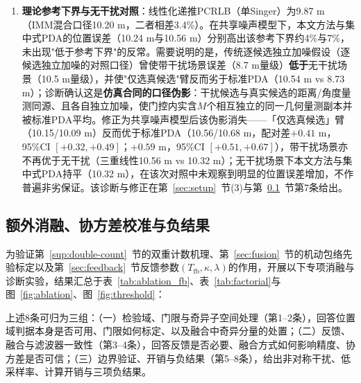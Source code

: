 \documentclass[UTF8,a4paper,zihao=-4]{ctexart}
\begin{document}
\begin{enumerate}
\item \textbf{理论参考下界与无干扰对照}：线性化递推PCRLB（单Singer）为9.87 m（IMM混合口径10.20 m，二者相差3.4\%）。在共享噪声模型下，本文方法与集中式PDA的位置误差（10.24 m与10.56 m）分别高出该参考下界约4\%与7\%，未出现"低于参考下界"的反常。需要说明的是，传统逐候选独立加噪假设（逐候选独立加噪的对照口径）曾使带干扰场景误差（8.7 m量级）\textbf{低于}无干扰场景（10.5 m量级），并使"仅选真候选"臂反而劣于标准PDA（10.54 m vs 8.73 m）；诊断确认这是\textbf{仿真合同的口径伪影}：干扰候选与真实候选的距离/角度量测同源、且各自独立加噪，使门控内实含$M$个相互独立的同一几何量测副本并被标准PDA平均。修正为共享噪声模型后该伪影消失——「仅选真候选」臂（10.15/10.09 m）反而优于标准PDA（10.56/10.68 m，配对差$+0.41$ m，95\%CI $[+0.32,+0.49]$；$+0.59$ m，95\%CI $[+0.51,+0.67]$），带干扰场景亦不再优于无干扰（三重线性10.56 m vs 10.32 m）；无干扰场景下本文方法与集中式PDA持平（10.32 m），在该次对照中未观察到明显的位置误差增加，不作普遍非劣保证。该诊断与修正在第~\ref{sec:setup}~节(3)与第~\ref{sup:ablation}~节第7条给出。
\end{enumerate}



\subsection{额外消融、协方差校准与负结果}\label{sup:ablation}
为验证第~\ref{sup:double-count}~节的双重计数机理、第~\ref{sec:fusion}~节的机动包络先验标定以及第~\ref{sec:feedback}~节反馈参数$(T_{\mathrm{fb}},\kappa,\lambda)$的作用，开展以下专项消融与诊断实验，结果汇总于表~\ref{tab:ablation_fb}、表~\ref{tab:factorial}与图~\ref{fig:ablation}、图~\ref{fig:threshold}：

上述8条可归为三组：（一）检验域、门限与奇异子空间处理（第1--2条），回答位置域判据本身是否可用、门限如何标定、以及融合中奇异分量的处置；（二）反馈、融合与滤波器一致性（第3--4条），回答反馈是否必要、融合方式如何影响精度、协方差是否可信；（三）边界验证、开销与负结果（第5--8条），给出非对称干扰、低采样率、计算开销与三项负结果。
\end{document}
